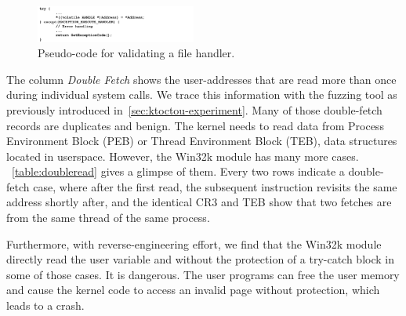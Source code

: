 \begin{figure}[th]
  \includegraphics[width=0.47\textwidth]{figures/probecode}
  \centering
  \caption{Pseudo-code for validating a file handler.}
  \label{fig:probecode}
\end{figure}



%
%
%




The column \textit{Double Fetch} shows the user-addresses that are read more than once during individual system calls. We trace this information with the fuzzing tool as previously introduced in~\autoref{sec:ktoctou-experiment}. Many of those double-fetch records are duplicates and benign. The kernel needs to read data from Process Environment Block (PEB) or Thread Environment Block (TEB), data structures located in userspace.  However, the Win32k module has many more cases. ~\autoref{table:doubleread} gives a glimpse of them. Every two rows indicate a double-fetch case, where after the first read, the subsequent instruction revisits the same address shortly after, and the identical CR3 and TEB show that two fetches are from the same thread of the same process.

Furthermore, with reverse-engineering effort, we find that the Win32k module directly read the user variable and without the protection of a try-catch block in some of those cases. It is dangerous. The user programs can free the user memory and cause the kernel code to access an invalid page without protection, which leads to a crash.

